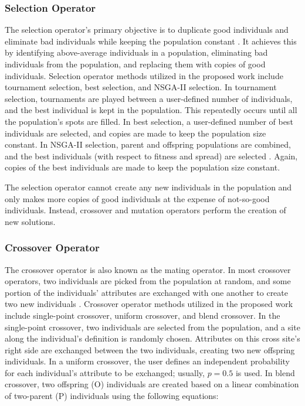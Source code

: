\subsubsection{Selection Operator}
The selection operator's primary objective is to duplicate good 
individuals and eliminate bad individuals while keeping the population 
constant \cite{deb_multi-objective_2001}. 
It achieves this by identifying above-average individuals in a population, 
eliminating bad individuals from the population, and replacing them with 
copies of good individuals.
Selection operator methods utilized in the proposed work include tournament 
selection, best selection, and NSGA-II selection. 
In tournament selection, tournaments are played between a user-defined number 
of individuals, and the best individual is kept in the population. 
This repeatedly occurs until all the population's spots are filled. 
In best selection, a user-defined number of best individuals are selected, 
and copies are made to keep the population size constant. 
In NSGA-II selection, parent and offspring populations are combined, and the
best individuals (with respect to fitness and spread) are selected
\cite{deb_fast_2002}.
Again, copies of the best individuals are made to keep the population size constant. 

The selection operator cannot create any new individuals in the population 
and only makes more copies of good individuals at the expense of not-so-good
individuals. 
Instead, crossover and mutation operators perform the creation of new solutions.

\subsubsection{Crossover Operator}
The crossover operator is also known as the mating operator. 
In most crossover operators, two individuals are picked from the population at 
random, and some portion of the individuals' attributes are exchanged with one 
another to create two new individuals \cite{deb_multi-objective_2001}. 
Crossover operator methods utilized in the proposed work include single-point
crossover, uniform crossover, and blend crossover. 
In the single-point crossover, two individuals are selected from the population,
and a site along the individual's definition is randomly chosen. 
Attributes on this cross site's right side are exchanged between the two 
individuals, creating two new offspring individuals.  
In a uniform crossover, the user defines an independent probability for each 
individual's attribute to be exchanged; usually, $p=0.5$ is used. 
In blend crossover, two offspring (O) individuals are created based on a linear 
combination of two-parent (P) individuals using the following equations: 

